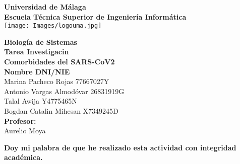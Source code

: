 \begin{center}
\textbf{\LARGE Universidad de Málaga}\\[0.5cm] 
\textbf{\large Escuela Técnica Superior de Ingeniería Informática}\\[0.2cm]
\vspace{20pt}\texttt{[image: Images/logouma.jpg]}\\
\par
\vspace{20pt}
  \textbf{\Large Biología de Sistemas}\\
\vspace{15pt}
\myrule[1pt][7pt]
\textbf{\LARGE  Tarea Investigacin}\\
\vspace{15pt}
\textbf{\large Comorbidades del SARS-CoV2}\\
\myrule[1pt][7pt]
\vspace{35pt}
\textbf{\large Nombre \hspace{100pt} DNI/NIE}\\
\vspace{15pt}
Marina Pacheco Rojas  \hspace{50pt} 77667027Y \\
Antonio Vargas Almodóvar \hspace{50pt} 26831919G \\ 
Talal Awija \hspace{50pt} Y4775465N \\ 
Bogdan Catalin Mihesan \hspace{50pt} X7349245D \\ 


\vspace{70pt}  
\textbf {\large Profesor:}\\[0.2cm]
\Large {Aurelio Moya}\\[0.1cm]
\end{center}

\par
\vfill
\begin{center}
\textbf{Doy mi palabra de que he realizado esta actividad con integridad académica.}\\
\end{center}

